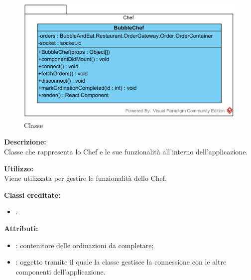 \paragraph[::Restaurant::Chef::BubbleChef]{\class}\mbox{}\\ \label{\class}
\begin{figure}[H]
	\centering
	\includegraphics[width=12cm]{./diagrammi/demo/client/bubblechef.png}
	\caption{Classe \class}
\end{figure}
\textbf{Descrizione:}\\
Classe che rappresenta lo Chef e le sue funzionalità all'interno dell'applicazione.

\textbf{Utilizzo:}\\
Viene utilizzata per gestire le funzionalità dello Chef.

\textbf{Classi ereditate:}
\begin{itemize}
	\item {}.
\end{itemize}


\textbf{Attributi:}
\begin{itemize}
	\item {}: contenitore delle ordinazioni da completare;
	\item {}: oggetto tramite il quale la classe gestisce la connessione con le altre componenti dell'applicazione.
\end{itemize}

